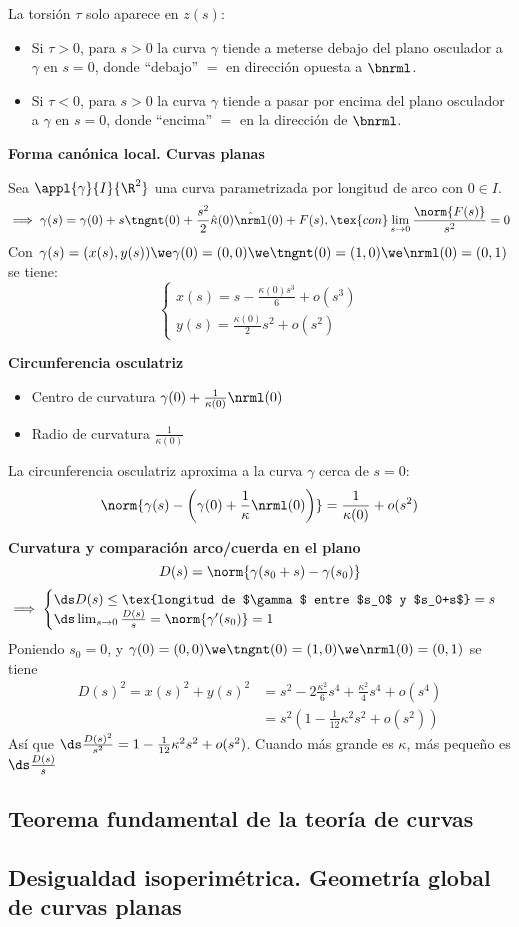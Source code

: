 La torsión $\tau$ solo aparece en $z(s)$:
\begin{itemize}
	\item Si $\tau > 0$, para $s>0$ la curva $\gamma$ tiende a meterse debajo del plano osculador a $\gamma$ en $s=0$, donde ``debajo'' $=$ en dirección opuesta a $\bnrml$.
	\item Si $\tau < 0$, para $s>0$ la curva $\gamma$ tiende a pasar por encima del plano osculador a $\gamma$ en $s=0$, donde ``encima'' $=$ en la dirección de $\bnrml$.
\end{itemize}

\textbf{Forma canónica local. Curvas planas}

Sea $\appl{\gamma}{I}{\R^2}$ una curva parametrizada por longitud de arco con $0\in I$.
\[\implies \gamma(s)=\gamma(0)+s\tngnt(0)+\frac{s^2}{2}\hat{\kappa}(0)\hat{\nrml}(0) + F(s), \tex{ con } \lim_{s\to 0}\frac{\norm{F(s)}}{s^2} = 0\]
Con $\gamma(s)=(x(s), y(s)) \we \gamma(0)=(0,0) \we \tngnt(0)=(1, 0) \we \nrml(0)=(0,1)$ se tiene:
\[\begin{cases}
	x(s)=s-\frac{\kappa(0)s^3}{6}+o(s^3) \\
	y(s)=\frac{\kappa(0)}{2}s^2 + o(s^2)
\end{cases}\]

\textbf{Circunferencia osculatriz}

\begin{itemize}
	\item Centro de curvatura $\gamma(0) + \frac{1}{\kappa(0)}\nrml(0)$
	\item Radio de curvatura $\frac{1}{\kappa(0)}$
\end{itemize}
La circunferencia osculatriz aproxima a la curva $\gamma$ cerca de $s=0$:
\[\norm{\gamma(s)-\left(\gamma(0) + \frac{1}{\kappa}\nrml(0)\right)}=\frac{1}{\kappa(0)} + o(s^2)\]

\textbf{Curvatura y comparación arco/cuerda en el plano}
\[D(s)=\norm{\gamma(s_0+s) - \gamma(s_0)}\]
\[\implies \begin{cases}
	\ds D(s) \leq \tex{longitud de $\gamma$ entre $s_0$ y $s_0+s$} = s \\
	\ds \lim_{s\to 0} \frac{D(s)}{s} = \norm{\gamma'(s_0)} = 1
\end{cases}\]
Poniendo $s_0=0$, y $\gamma(0)=(0,0) \we \tngnt(0)=(1, 0) \we \nrml(0)=(0, 1)$ se tiene
\[\begin{aligned} D(s)^2 = x(s)^2+y(s)^2 &= s^2-2\frac{\kappa^2}{6}s^4 + \frac{\kappa^2}{4}s^4 + o(s^4) \\
&= s^2\left(1-\frac{1}{12}\kappa^2s^2+o(s^2)\right)\end{aligned}\]
Así que $\ds \frac{D(s)^2}{s^2} = 1-\frac{1}{12}\kappa^2s^2+o(s^2)$. Cuando más grande es $\kappa$, más pequeño es $\ds \frac{D(s)}{s}$

\subsection{Teorema fundamental de la teoría de curvas}

\subsection{Desigualdad isoperimétrica. Geometría global de curvas planas}